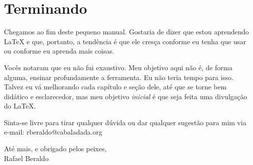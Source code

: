 \chapter{Terminando}

Chegamos ao fim deste pequeno manual. Gostaria de dizer que estou aprendendo \LaTeX{} e que, portanto, a tendência é que ele cresça conforme eu tenha que usar ou conforme eu aprenda mais coisas.

Vocês notaram que eu não fui exaustivo. Meu objetivo aqui não é, de forma alguma, ensinar profundamente a ferramenta. Eu não teria tempo para isso. Talvez eu vá melhorando cada capítulo e seção dele, até que se torne bem didático e esclarecedor, mas meu objetivo \emph{inicial} é que seja feita uma divulgação do \LaTeX.

Sinta-se livre para tirar qualquer dúvida ou dar qualquer sugestão para mim via e-mail: \textsf{rberaldo@cabaladada.org}

\begin{flushright}
Até mais, e obrigado pelos peixes,\\
Rafael Beraldo
\end{flushright}
